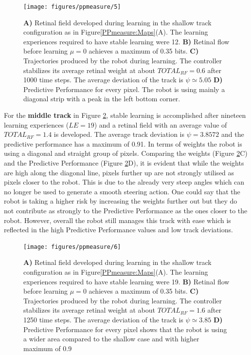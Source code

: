 \begin{figure}[!hbt]
	\begin{center}
	\texttt{[image: figures/ppmeasure/5]}
	\end{center}
	\caption[Performance for the shallow track]{
	{\bf A)} Retinal field developed during learning in the shallow track configuration as in Figure\ref{PPmeasure:Maps}(A).
		      The learning experiences required to have stable learning were 12.
	{\bf B)} Retinal flow before learning $\mu=0$ achieves a maximum of 0.35 bits. 
	{\bf C)} Trajectories produced by the robot during learning. The controller stabilizes its average retinal weight at about $TOTAL_{RF}=0.6$ after 1000 time steps. The average deviation of the track is $\psi \simeq 5.05$  
	{\bf D)} Predictive Performance for every pixel. The robot is using mainly a diagonal strip with a peak in the left bottom corner. \label{PPmeasure:shallow}}
\end{figure}

For the \textbf{middle track} in Figure \ref{PPmeasure:middle}, stable learning is accomplished
after nineteen learning experiences ($LE=19$) and a retinal field
with an average value of $TOTAL_{RF}=1.4$ is developed.
The average track deviation is $\psi=3.8572$ and the predictive performance has a
maximum of 0.91.
In terms of weights the robot is using a diagonal and straight group of pixels.
Comparing the weights (Figure \ref{PPmeasure:middle}C) and the
Predictive Performance (Figure \ref{PPmeasure:middle}D),
it is evident that while the weights are high along the diagonal line, pixels further up
are not strongly utilised as pixels closer to the robot.
This is due to the already very steep angles which can no
longer be used to generate a smooth steering action. One could say that the
robot is taking a higher risk by increasing the weights further out but they do
not contribute as strongly to the Predictive Performance as the ones closer to
the robot. However, overall the robot still manages this track with ease which is
reﬂected in the high Predictive Performance values and low track deviations.

\begin{figure}[!hbt]
	\begin{center}
		\texttt{[image: figures/ppmeasure/6]}
	\end{center}
	\caption[Performance for the intermediate track]{
	{\bf A)} Retinal field developed during learning in the shallow track configuration as in Figure\ref{PPmeasure:Maps}(A).
		      The learning experiences required to have stable learning were 19.
	{\bf B)} Retinal flow before learning $\mu=0$ achieves a maximum of 0.35 bits. 
	{\bf C)} Trajectories produced by the robot during learning. The controller stabilizes its average retinal weight at about $TOTAL_{RF}=1.6$ after 1250 time steps. The average deviation of the track is $\psi \simeq 3.85$  
	{\bf D)} Predictive Performance for every pixel shows that the robot is using a wider area compared to the shallow case and with higher maximum of 0.9 \label{PPmeasure:middle}}
\end{figure}

